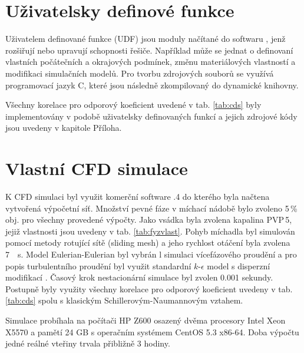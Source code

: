\section{Uživatelsky definové funkce}
Uživatelem definované funkce (UDF) jsou moduly načítané do softwaru \flu, jenž rozšiřují nebo upravují schopnosti řešiče. Například může se jednat o definovaní vlastních počátečních a okrajových podmínek, změnu materiálových vlastností a modifikaci simulačních modelů. Pro tvorbu zdrojových souborů se využívá programovací jazyk C, které jsou následně zkompilovaný do dynamické knihovny.

Všechny korelace pro odporový koeficient uvedené v tab. \ref{tab:cds} byly implementovány v podobě uživatelsky definovaných funkcí a jejich zdrojové kódy jsou uvedeny v kapitole Příloha.

\section{Vlastní CFD simulace}
K CFD simulaci byl využit komerční software .4 do kterého byla načtena vytvořená výpočetní síť. Množství pevné fáze v míchací nádobě bylo zvoleno 5\,\%\,obj. pro všechny provedené výpočty. Jako vsádka byla zvolena kapalina PVP\,5, jejiž vlastnosti jsou uvedeny v tab. \ref{tab:fyzvlast}. Pohyb míchadla byl simulován pomocí metody rotující sítě (sliding mesh) a jeho rychlost otáčení byla zvolena \SI{7}{\per\second}. Model Eulerian-Eulerian byl vybrán l simulaci vícefázového proudění a pro popis turbulentního proudění byl využit standardní $k\mbox{-}\epsilon$ model s disperzní modifikací . Časový krok nestacionární simulace byl zvolen \num{0.001} sekundy. Postupně byly využity všechny korelace pro odporový koeficient uvedeny v tab. \ref{tab:cds} spolu s klasickým Schillerovým-Naumannovým vztahem. 

Simulace probíhala na počítači HP Z600 osazený dvěma procesory Intel Xeon X5570 a pamětí 24 GB s operačním systémem CentOS 5.3 x86-64. Doba výpočtu jedné reálné vteřiny trvala přibližně 3 hodiny.


